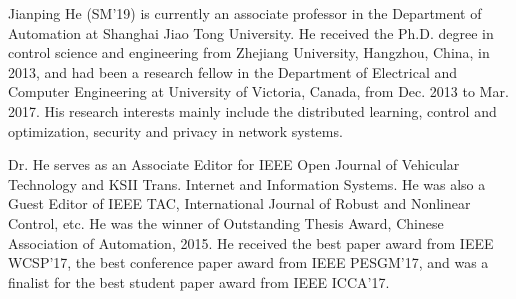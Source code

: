 \documentclass[12pt,journal,draftclsnofoot,onecolumn]{IEEEtran}
\begin{document}
\begin{IEEEbiographynophoto}{Jianping He} 
(SM'19) is currently an associate professor in the Department of Automation at Shanghai Jiao Tong University. He received the Ph.D. degree in control science and engineering from Zhejiang University, Hangzhou, China, in 2013, and had been a research fellow in the Department of Electrical and Computer Engineering at University of Victoria, Canada, from Dec. 2013 to Mar. 2017. His research interests mainly include the distributed learning, control and optimization, security and privacy in network systems.

Dr. He serves as an Associate Editor for IEEE Open Journal of Vehicular Technology and KSII Trans. Internet and Information Systems. He was also a Guest Editor of IEEE TAC, International Journal of Robust and Nonlinear Control, etc. He was the winner of Outstanding Thesis Award, Chinese Association of Automation, 2015. He received the best paper award from IEEE WCSP'17, the best conference paper award from IEEE PESGM'17, and was a finalist for the best student paper award from IEEE ICCA'17.
\end{IEEEbiographynophoto}
\vspace{-20pt}

\end{document}
